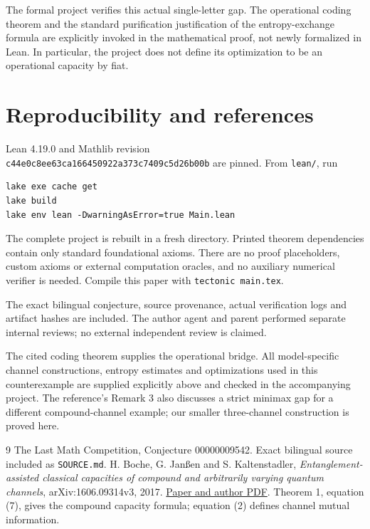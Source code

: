 \documentclass[11pt]{article}
\begin{document}
The formal project verifies this actual single-letter
gap. The operational coding theorem and the standard
purification justification of the entropy-exchange
formula are explicitly invoked in the mathematical
proof, not newly formalized in Lean. In particular,
the project does not define its optimization to be
an operational capacity by fiat.

\newpage
\section*{Reproducibility and references}
Lean 4.19.0 and Mathlib revision\\
\texttt{c44e0c8ee63ca166450922a373c7409c5d26b00b}
are pinned. From \texttt{lean/}, run
\begin{verbatim}
lake exe cache get
lake build
lake env lean -DwarningAsError=true Main.lean
\end{verbatim}
The complete project is rebuilt in a fresh directory.
Printed theorem dependencies contain only standard
foundational axioms. There are no proof placeholders,
custom axioms or external computation oracles, and no
auxiliary numerical verifier is needed. Compile this
paper with \texttt{tectonic main.tex}.

The exact bilingual conjecture, source provenance,
actual verification logs and artifact hashes are
included. The author agent and parent performed
separate internal reviews; no external independent
review is claimed.

The cited coding theorem supplies the operational
bridge. All model-specific channel constructions,
entropy estimates and optimizations used in this
counterexample are supplied explicitly above and
checked in the accompanying project. The reference's
Remark 3 also discusses a strict minimax gap for a
different compound-channel example; our smaller
three-channel construction is proved here.

\begin{thebibliography}{9}
 The Last Math Competition,
Conjecture 00000009542. Exact bilingual source included
as \texttt{SOURCE.md}.
 H. Boche, G. Jan\ss en and S. Kaltenstadler,
\emph{Entanglement-assisted classical capacities of
compound and arbitrarily varying quantum channels},
arXiv:1606.09314v3, 2017.
\href{https://arxiv.org/abs/1606.09314}{Paper and author PDF}.
Theorem 1, equation (7), gives the compound capacity
formula; equation (2) defines channel mutual information.
\end{thebibliography}
\end{document}
